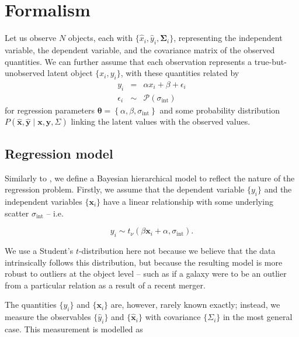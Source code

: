 \documentclass[fleqn,usenatbib]{mnras}
\newcommand{\studentt}[2]{t_\nu \left( #1, #2 \right)}
\newcommand{\depvar}{y_i}
\newcommand{\indepvars}{\boldsymbol{x}_i}
\newcommand{\obsdep}{\hat{y}_i}
\newcommand{\obsindep}{\hat{\boldsymbol{x}}_i}
\newcommand{\obserr}{\Sigma_i}
\newcommand{\intscttr}{\sigma_{\text{int}}}
\newcommand{\intercept}{\alpha}
\newcommand{\covariate}{\beta}
\begin{document}
\section{Formalism}
\label{sec:formalism}

Let us observe $N$ objects, each with $\{\hat{x}_i, \hat{y}_i,
\boldsymbol{\Sigma}_i\}$, representing the independent variable, the dependent
variable, and the covariance matrix of the observed quantities.  We can further
assume that each observation represents a true-but-unobserved latent object
$\{x_i, y_i\}$, with these quantities related by
\begin{eqnarray}
    y_i &=& \alpha x_i + \beta + \epsilon_i \\
    \epsilon_i &\sim& \mathcal{P} \left( \sigma_{\text{int}} \right)
\end{eqnarray}
for regression parameters $\boldsymbol{\theta} = \left\{\alpha, \beta,
\sigma_{\mathrm{int}}\right\}$ and some probability distribution $P\left(
\hat{\mathbf{x}}, \hat{\mathbf{y}} \mid \mathbf{x}, \mathbf{y}, \Sigma \right)$
linking the latent values with the observed values.

\subsection{Regression model}
\label{sec:formalism.model}

Similarly to \citet{Kelly:2007}, we define a Bayesian hierarchical model to
reflect the nature of the regression problem. Firstly, we assume that the
dependent variable $\{\depvar\}$ and the independent variables $\{\indepvars\}$
have a linear relationship with some underlying scatter $\intscttr$ -- i.e.

\begin{equation}
\depvar \sim \studentt{\covariate \indepvars + \intercept}{\intscttr}.
\end{equation}

We use a Student's $t$-distribution here not because we believe that the data
intrinsically follows this distribution, but because the resulting model is more
robust to outliers at the object level -- such as if a galaxy were to be an
outlier from a particular relation as a result of a recent merger.

The quantities $\{\depvar\}$ and $\{\indepvars\}$ are, however, rarely known
exactly; instead, we measure the observables $\{\obsdep\}$ and $\{\obsindep\}$
with covariance $\{\obserr\}$ in the most general case. This measurement is
modelled as
\end{document}

